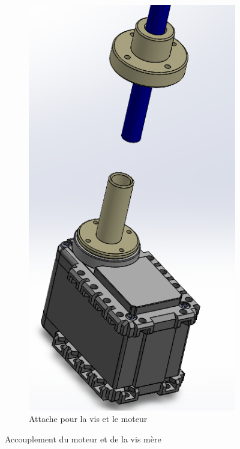 \documentclass[a4paper, 11pt]{report}
\begin{document}
\begin{figure}
\begin{subfigure}[t]{0.2\textwidth}
                    \includegraphics[width=\textwidth]{Figures/attache.png}
                    \caption{Attache pour la vis et le moteur}
                    \label{fig:wait...}
                \end{subfigure}
                \caption{Accouplement du moteur et de la vis mère}
            \end{figure}
\end{document}
